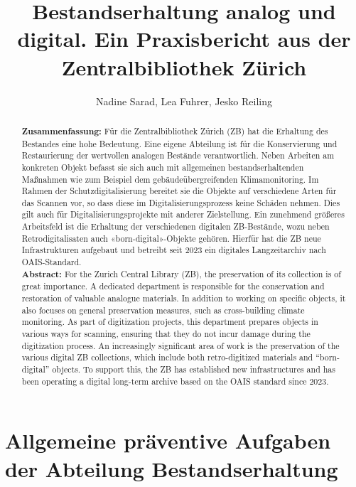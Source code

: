 \documentclass[a4paper,
fontsize=11pt,
oneside,
numbers=noperiodatend,
parskip=half-,
bibliography=totoc,
final
]{scrartcl}
\title{\LARGE{Bestandserhaltung analog und digital. Ein Praxisbericht aus der Zentralbibliothek Zürich}}%
\author{Nadine Sarad, Lea Fuhrer, Jesko Reiling} %
\date{}
\begin{document}
\maketitle
\thispagestyle{fancyplain} 

\begin{abstract}
\noindent
\textbf{Zusammenfassung:} Für die Zentralbibliothek Zürich (ZB) hat die
Erhaltung des Bestandes eine hohe Bedeutung. Eine eigene Abteilung ist
für die Konservierung und Restaurierung der wertvollen analogen Bestände
verantwortlich. Neben Arbeiten am konkreten Objekt befasst sie sich auch
mit allgemeinen bestandserhaltenden Maßnahmen wie zum Beispiel dem
gebäudeübergreifenden Klimamonitoring. Im Rahmen der
Schutzdigitalisierung bereitet sie die Objekte auf verschiedene Arten
für das Scannen vor, so dass diese im Digitalisierungsprozess keine
Schäden nehmen. Dies gilt auch für Digitalisierungsprojekte mit anderer
Zielstellung. Ein zunehmend größeres Arbeitsfeld ist die Erhaltung der
verschiedenen digitalen ZB-Bestände, wozu neben Retrodigitalisaten auch
«born-digital»-Objekte gehören. Hierfür hat die ZB neue Infrastrukturen
aufgebaut und betreibt seit 2023 ein digitales Langzeitarchiv nach
OAIS-Standard. \\

\noindent
\textbf{Abstract:} For the Zurich Central Library (ZB), the preservation
of its collection is of great importance. A dedicated department is
responsible for the conservation and restoration of valuable analogue
materials. In addition to working on specific objects, it also focuses
on general preservation measures, such as cross-building climate
monitoring. As part of digitization projects, this department prepares
objects in various ways for scanning, ensuring that they do not incur
damage during the digitization process. An increasingly significant area
of work is the preservation of the various digital ZB collections, which
include both retro-digitized materials and \enquote{born-digital} objects. To
support this, the ZB has established new infrastructures and has been
operating a digital long-term archive based on the OAIS standard since
2023.
\end{abstract}

\section{Allgemeine präventive Aufgaben der Abteilung
Bestandserhaltung}\label{allgemeine-pruxe4ventive-aufgaben-der-abteilung-bestandserhaltung}
\end{document}
